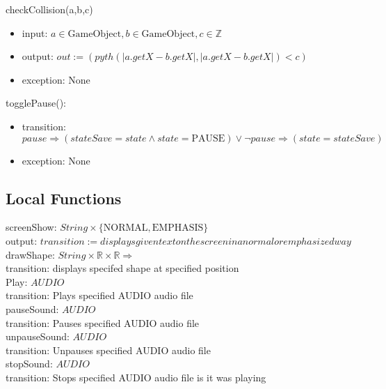 \documentclass[12pt]{article}
\begin{document}
\noindent checkCollision(a,b,c)
\begin{itemize}
  \item input: $a \in \mbox{GameObject}, b \in \mbox{GameObject}, c \in \mathbb{Z}$
  \item output: $out := (pyth(|a.getX - b.getX|, |a.getX - b.getX|) < c)$
  \item exception: None
\end{itemize}

\noindent togglePause():
\begin{itemize}
    \item transition: $ pause \Rightarrow (stateSave = state \land state = \mbox{PAUSE}) \lor \lnot pause \Rightarrow (state = stateSave) $
    \item exception: None
\end{itemize}

\subsection*{Local Functions}

\noindent screenShow: $String\times\{\mbox{NORMAL},\mbox{EMPHASIS}\}$\\
\noindent output: $transition := displays given text on the screen in a normal or emphasized way$\\

\noindent drawShape: $String\times\mathbb{R}\times\mathbb{R}\Rightarrow$\\
\noindent transition: displays specifed shape at specified position\\

\noindent Play: $AUDIO$\\
\noindent transition: Plays specified AUDIO audio file\\

\noindent pauseSound: $AUDIO$\\
\noindent transition: Pauses specified AUDIO audio file\\

\noindent unpauseSound: $AUDIO$\\
\noindent transition: Unpauses specified AUDIO audio file\\

\noindent stopSound: $AUDIO$\\
\noindent transition: Stops specified AUDIO audio file is it was playing\\


%
%
%





\end{document}
